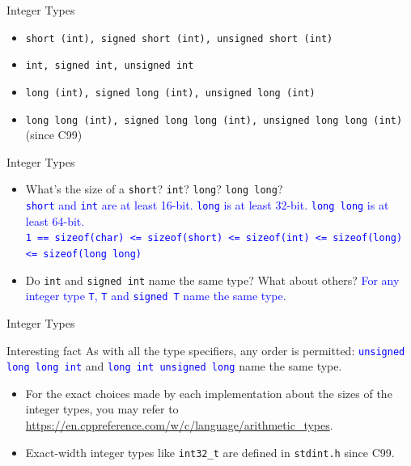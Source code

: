 \documentclass[handout]{beamer}
\newcommand{\blue}[1]{\textcolor{blue}{#1}}
\begin{document}
\begin{frame}{Integer Types}
    \begin{itemize}
        \item \texttt{short (int), signed short (int), unsigned short (int)}
        \item \texttt{int, signed int, unsigned int}
        \item \texttt{long (int), signed long (int), unsigned long (int)}
        \item \texttt{long long (int), signed long long (int), unsigned long long (int)} (since C99)
    \end{itemize}
\end{frame}

\begin{frame}{Integer Types}
    \begin{itemize}
        \item What's the size of a \texttt{short}? \texttt{int}? \texttt{long}? \texttt{long long}?\\
        \pause
        \blue{\texttt{short} and \texttt{int} are at least 16-bit. \texttt{long} is at least 32-bit. \texttt{long long} is at least 64-bit.}\\
        \blue{\texttt{1 == sizeof(char) <= sizeof(short) <= sizeof(int) <= sizeof(long) <= sizeof(long long)}}
        \pause
        \item Do \texttt{int} and \texttt{signed int} name the same type? What about others?
        \pause
        \blue{For any integer type \texttt{T}, \texttt{T} and \texttt{signed T} name the same type.}
    \end{itemize}
\end{frame}

\begin{frame}{Integer Types}
    \begin{alertblock}{Interesting fact}
        As with all the type specifiers, any order is permitted: \blue{\texttt{unsigned long long int}} and \blue{\texttt{long int unsigned long}} name the same type.
    \end{alertblock}
    \pause
    \begin{itemize}
        \item For the exact choices made by each implementation about the sizes of the integer types, you may refer to \url{https://en.cppreference.com/w/c/language/arithmetic_types}.
        \pause
        \item Exact-width integer types like \texttt{int32\_t} are defined in \texttt{stdint.h} since C99.
    \end{itemize}
\end{frame}
\end{document}
